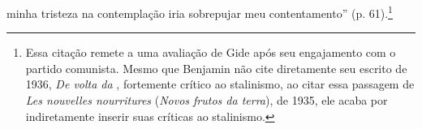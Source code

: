 minha tristeza na contemplação iria sobrepujar meu contentamento'' (p.
61).\footnote{Essa citação remete a uma avaliação de Gide após seu
  engajamento com o partido comunista. Mesmo que Benjamin não cite
  diretamente seu escrito de 1936, \emph{De volta da} ,
  fortemente crítico ao stalinismo, ao citar essa passagem de \emph{Les
  nouvelles nourritures} (\emph{Novos frutos da terra}), de 1935, ele
  acaba por indiretamente inserir suas críticas ao stalinismo.}

